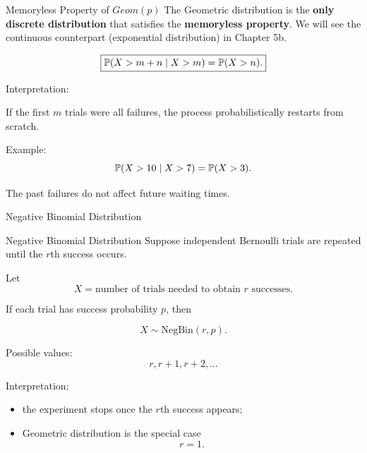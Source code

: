 \begin{frame}{Memoryless Property of $Geom(p)$ }
The Geometric distribution is the \textbf{only discrete distribution} that satisfies the \textbf{memoryless property}. We will see the continuous counterpart (exponential distribution) in Chapter 5b.

\[
\boxed{
\mathbb{P}(X>m+n \mid X>m)
=
\mathbb{P}(X>n).
}
\]

\vspace{0.25cm}

Interpretation:

\vspace{0.15cm}

If the first $m$ trials were all failures, the process probabilistically restarts from scratch.

\vspace{0.25cm}

Example:
\[
\mathbb{P}(X>10 \mid X>7)
=
\mathbb{P}(X>3).
\]

\vspace{0.25cm}

The past failures do not affect future waiting times.
\end{frame}









\begin{frame}{Negative Binomial Distribution}
\begin{keybox}{Negative Binomial Distribution}
Suppose independent Bernoulli trials are repeated until the $r$th success occurs.

Let
\[
X=\text{number of trials needed to obtain } r \text{ successes}.
\]

If each trial has success probability $p$, then

\[
X\sim\text{NegBin}(r,p).
\]
\end{keybox}

\vspace{0.25cm}

Possible values:
\[
r,r+1,r+2,\dots
\]

\vspace{0.25cm}

Interpretation:
\begin{itemize}
    \item the experiment stops once the $r$th success appears;
    \item Geometric distribution is the special case
    \[
    r=1.
    \]
\end{itemize}
\end{frame}











